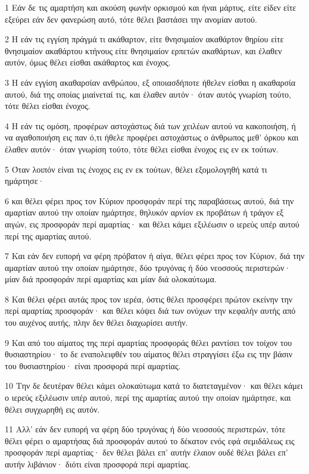 \par 1 Εάν δε τις αμαρτήση και ακούση φωνήν ορκισμού και ήναι μάρτυς, είτε είδεν είτε εξεύρει εάν δεν φανερώση αυτό, τότε θέλει βαστάσει την ανομίαν αυτού.
\par 2 Η εάν τις εγγίση πράγμά τι ακάθαρτον, είτε θνησιμαίον ακαθάρτον θηρίου είτε θνησιμαίον ακαθάρτου κτήνους είτε θνησιμαίον ερπετών ακαθάρτων, και έλαθεν αυτόν, όμως θέλει είσθαι ακάθαρτος και ένοχος.
\par 3 Η εάν εγγίση ακαθαρσίαν ανθρώπου, εξ οποιασδήποτε ήθελεν είσθαι η ακαθαρσία αυτού, διά της οποίας μιαίνεταί τις, και έλαθεν αυτόν· όταν αυτός γνωρίση τούτο, τότε θέλει είσθαι ένοχος.
\par 4 Η εάν τις ομόση, προφέρων αστοχάστως διά των χειλέων αυτού να κακοποιήση, ή να αγαθοποιήση εις παν ό,τι ήθελε προφέρει αστοχάστως ο άνθρωπος μεθ' όρκου και έλαθεν αυτόν· όταν γνωρίση τούτο, τότε θέλει είσθαι ένοχος εις εν εκ τούτων.
\par 5 Όταν λοιπόν είναι τις ένοχος εις εν εκ τούτων, θέλει εξομολογηθή κατά τι ημάρτησε·
\par 6 και θέλει φέρει προς τον Κύριον προσφοράν περί της παραβάσεως αυτού, διά την αμαρτίαν αυτού την οποίαν ημάρτησε, θηλυκόν αρνίον εκ προβάτων ή τράγον εξ αιγών, εις προσφοράν περί αμαρτίας· και θέλει κάμει εξιλέωσιν ο ιερεύς υπέρ αυτού περί της αμαρτίας αυτού.
\par 7 Και εάν δεν ευπορή να φέρη πρόβατον ή αίγα, θέλει φέρει προς τον Κύριον, διά την αμαρτίαν αυτού την οποίαν ημάρτησε, δύο τρυγόνας ή δύο νεοσσούς περιστερών· μίαν διά προσφοράν περί αμαρτίας και μίαν διά ολοκαύτωμα.
\par 8 Και θέλει φέρει αυτάς προς τον ιερέα, όστις θέλει προσφέρει πρώτον εκείνην την περί αμαρτίας προσφοράν· και θέλει κόψει διά των ονύχων την κεφαλήν αυτής από του αυχένος αυτής, πλην δεν θέλει διαχωρίσει αυτήν.
\par 9 Και από του αίματος της περί αμαρτίας προσφοράς θέλει ραντίσει τον τοίχον του θυσιαστηρίου· το δε εναπολειφθέν του αίματος θέλει στραγγίσει έξω εις την βάσιν του θυσιαστηρίου· είναι προσφορά περί αμαρτίας.
\par 10 Την δε δευτέραν θέλει κάμει ολοκαύτωμα κατά το διατεταγμένον· και θέλει κάμει ο ιερεύς εξιλέωσιν υπέρ αυτού, περί της αμαρτίας αυτού την οποίαν ημάρτησε, και θέλει συγχωρηθή εις αυτόν.
\par 11 Αλλ' εάν δεν ευπορή να φέρη δύο τρυγόνας ή δύο νεοσσούς περιστερών, τότε θέλει φέρει ο αμαρτήσας διά προσφοράν αυτού το δέκατον ενός εφά σεμιδάλεως εις προσφοράν περί αμαρτίας· δεν θέλει βάλει επ' αυτήν έλαιον ουδέ θέλει βάλει επ' αυτήν λιβάνιον· διότι είναι προσφορά περί αμαρτίας.
